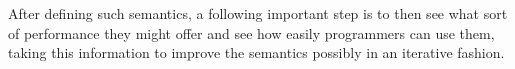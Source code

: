 After defining such semantics, a following important step is to then see what sort of performance they might
offer and see how easily programmers can use them, taking this information to improve the semantics
possibly in an iterative fashion.
 
